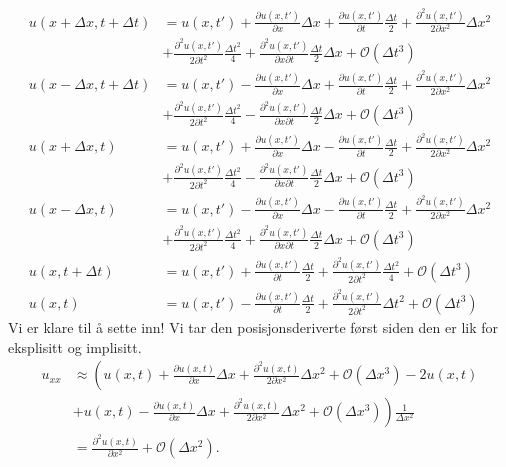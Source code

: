 \documentclass[norsk, 10pt]{article}
\begin{document}
\begin{align}
u(x+\Delta x, t+\Delta t)&=u(x,t')+\frac{\partial u(x,t')}{\partial x}\Delta x+\frac{\partial u(x,t')}{\partial t} \frac{\Delta t}{2} +\frac{\partial^2 u(x,t')}{2\partial x^2}\Delta x^2\nonumber \\ 
&+\frac{\partial^2 u(x,t')}{2\partial t^2}\frac{\Delta t^2}{4} +\frac{\partial^2 u(x,t')}{\partial x\partial t}\frac{\Delta t}{2} \Delta x+ \mathcal{O}(\Delta t^3) \label{eq:deltaxdeltatpluss} \\
%
u(x-\Delta x, t+\Delta t)&=u(x,t')-\frac{\partial u(x,t')}{\partial x}\Delta x+\frac{\partial u(x,t')}{\partial t} \frac{\Delta t}{2} +\frac{\partial^2 u(x,t')}{2\partial x^2}\Delta x^2\\  \nonumber
&+\frac{\partial^2 u(x,t')}{2\partial t^2}\frac{\Delta t^2}{4} -\frac{\partial^2 u(x,t')}{\partial x\partial t}\frac{\Delta t}{2} \Delta x+ \mathcal{O}(\Delta t^3) \label{eq:deltaxmindeltatpluss} \\
%
u(x+\Delta x,t)&=u(x,t')+\frac{\partial u(x,t')}{\partial x}\Delta x-\frac{\partial u(x,t')}{\partial t} \frac{\Delta t}{2} +\frac{\partial^2 u(x,t')}{2\partial x^2}\Delta x^2\\  \nonumber
&+\frac{\partial^2 u(x,t')}{2\partial t^2}\frac{\Delta t^2}{4} -\frac{\partial^2 u(x,t')}{\partial x\partial t}\frac{\Delta t}{2} \Delta x+ \mathcal{O}(\Delta t^3) \label{eq:deltaxplussCN}\\ 
%
u(x-\Delta x,t)&=u(x,t')-\frac{\partial u(x,t')}{\partial x}\Delta x-\frac{\partial u(x,t')}{\partial t} \frac{\Delta t}{2} +\frac{\partial^2 u(x,t')}{2\partial x^2}\Delta x^2 \\  \nonumber
&+\frac{\partial^2 u(x,t')}{2\partial t^2}\frac{\Delta t^2}{4} +\frac{\partial^2 u(x,t')}{\partial x\partial t}\frac{\Delta t}{2} \Delta x+ \mathcal{O}(\Delta t^3) \label{eq:deltaxminCN} \\
%
u(x,t+\Delta t)&=u(x,t')+\frac{\partial u(x,t')}{\partial t}\frac{\Delta t}{2} +\frac{\partial ^2 u(x,t')}{2\partial t^2}\frac{\Delta t^2}{4} + \mathcal{O}(\Delta t^3) \\
%
u(x,t)&=u(x,t')-\frac{\partial u(x,t')}{\partial t}\frac{\Delta t}{2}+\frac{\partial ^2 u(x,t')}{2\partial t^2}\Delta t^2 + \mathcal{O}(\Delta t^3) \label{eq:uxtCN}
\end{align}
Vi er klare til å sette inn! Vi tar den posisjonsderiverte først siden den er lik for eksplisitt og implisitt.
\begin{align}
u_{xx} &\approx \left(u(x,t)+\frac{\partial u(x,t)}{\partial x} \Delta x+\frac{\partial^2 u(x,t)}{2\partial x^2}\Delta x^2+\mathcal{O}(\Delta x^3) - 2 u(x,t)\right. \nonumber\\
& \left.+ u(x,t)-\frac{\partial u(x,t)}{\partial x}\Delta x+\frac{\partial^2 u(x,t)}{2\partial x^2} \Delta x^2+\mathcal{O}(\Delta x^3)\right)\frac{1}{\Delta x^2}\nonumber \\
&=\frac{\partial^2 u(x,t)}{\partial x^2} +\mathcal{O}(\Delta x^2). \label{eq:trunkxx}
\end{align}
\end{document}
